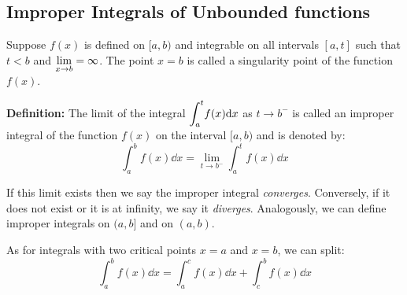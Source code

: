 \documentclass[12pt]{article}
\begin{document}
\subsection{Improper Integrals of Unbounded functions}
\par Suppose $f(x)$ is defined on $[a,b)$ and integrable on all intervals $[a,t]$ such that $t<b$ and $\mathlarger{\lim_{x \rightarrow b} = \infty}$. The point $x=b$ is called a singularity point of the function $f(x)$.
\begin{concept}
    \textbf{Definition:} The limit of the integral $\mathlarger{\int_a^t} f(x) \dd x$ as $t \rightarrow b^-$ is called an improper integral of the function $f(x)$ on the interval $[a,b)$ and is denoted by:
    \begin{equation*}
        \int_a^b f(x) \dd x = \lim_{t \rightarrow b^-}\int_a^t f(x) \dd x
    \end{equation*}
\end{concept}
If this limit exists then we say the improper integral \emph{converges}. Conversely, if it does not exist or it is at infinity, we say it \emph{diverges}. Analogously, we can define improper integrals on $(a,b]$ and on $(a,b)$.
\par As for integrals with two critical points $x=a$ and $x=b$, we can split:
\begin{equation*}
    \int_a^b f(x) \dd x = \int_a^c f(x) \dd x + \int_c^b f(x) \dd x
\end{equation*}
\end{document}

